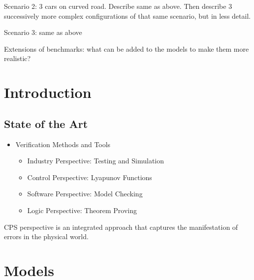 \documentclass{easychair}
\theoremstyle{theorem}
\theoremstyle{remark}
\begin{document}
Scenario 2: 3 cars on curved road. 
Describe same as above.
Then describe 3 successively more complex configurations of that same scenario, but in less detail.


Scenario 3: same as above

Extensions of benchmarks: what can be added to the models to make them more realistic?
\section{Introduction}
\label{sect:introduction}

\subsection{State of the Art}
\begin{itemize}
	\item Verification Methods and Tools
	\begin{itemize}
		\item Industry Perspective: Testing and Simulation
		\item Control Perspective: Lyapunov Functions
		\item Software Perspective: Model Checking
		\item Logic Perspective: Theorem Proving
	\end{itemize}
\end{itemize}
CPS perspective is an integrated approach that captures the manifestation of errors in the physical world. 

\section{Models}
\label{sect:model}
\end{document}

